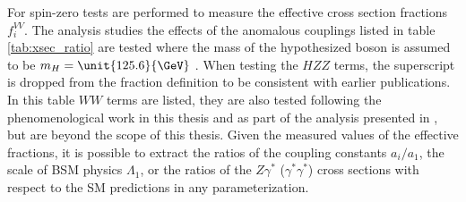 For spin-zero tests are performed to measure the effective cross section fractions $f_{i}^{VV}$. The analysis studies the effects of the anomalous couplings listed in table \ref{tab:xsec_ratio} are tested where the mass of the hypothesized boson is assumed to be $m_{H} = \unit{125.6}{\GeV}$ \cite{Chatrchyan:2013mxa}. When testing the $HZZ$ terms, the superscript is dropped from the fraction definition to be consistent with earlier publications. In this table $WW$ terms are listed, they are also tested following the phenomenological work in this thesis and as part of the analysis presented in \cite{Khachatryan:2014kca}, but are beyond the scope of this thesis. Given the measured values of the effective fractions, it is possible to extract the ratios of the coupling constants $a_i/a_1$, the scale of BSM physics $\Lambda_{1}$, or the ratios of the $Z\gamma^*$ ($\gamma^*\gamma^*$) cross sections with respect to the SM predictions in any parameterization.



